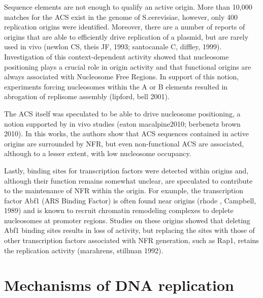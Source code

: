 \vspace{5mm}

Sequence elements are not enough to qualify an active origin. More than 10,000 matches for the ACS exist in the genome of S.cerevisiae, however, only 400 replication origins were identified. Moreover, there are a number of reports of origins that are able to efficiently drive replication of a plasmid, but are rarely used in vivo (newlon CS, theis JF, 1993; santocanale C, diffley, 1999). Investigation of this context-dependent activity showed that nucleosome positioning plays a crucial role in origin activity and that functional origins are always associated with Nucleosome Free Regions. In support of this notion, experiments forcing nucleosomes within the A or B elements resulted in abrogation of replisome assembly (lipford, bell 2001). 

The ACS itself was speculated to be able to drive nucleosome positioning, a notion supported by in vivo studies (eaton macalpine2010; berbenetz brown 2010). In this works, the authors show that ACS sequences contained in active origins are surrounded by NFR, but even non-functional ACS are associated, although to a lesser extent, with low nucleosome occupancy.

Lastly, binding sites for transcription factors were detected within origins and, although their function remains somewhat unclear, are speculated to contribute to the maintenance of NFR within the origin. For example, the transcription factor Abf1 (ARS Binding Factor) is often found near origins (rhode , Campbell, 1989) and is known to recruit chromatin remodeling complexes to deplete nucleosomes at promoter regions. Studies on these origins showed that deleting Abf1 binding sites results in loss of activity, but replacing the sites with those of other transcription factors associated with NFR generation, such as Rap1, retains the replication activity (marahrens, stillman 1992).

\section{Mechanisms of DNA replication}

